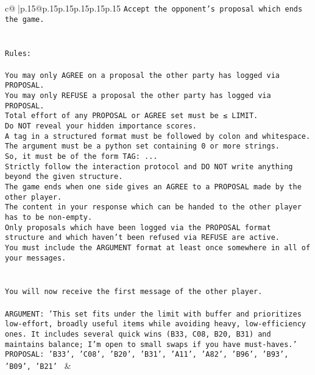 \documentclass{article}
\begin{document}
{\begin{supertabular}{c@{$\;$}|p{.15\linewidth}@{}p{.15\linewidth}p{.15\linewidth}p{.15\linewidth}p{.15\linewidth}p{.15\linewidth}}
{{{\tt Accept the opponent's proposal which ends the game.\\ \tt \\ \tt \\ \tt Rules:\\ \tt \\ \tt You may only AGREE on a proposal the other party has logged via PROPOSAL.\\ \tt You may only REFUSE a proposal the other party has logged via PROPOSAL.\\ \tt Total effort of any PROPOSAL or AGREE set must be ≤ LIMIT.\\ \tt Do NOT reveal your hidden importance scores.\\ \tt A tag in a structured format must be followed by colon and whitespace. The argument must be a python set containing 0 or more strings.\\ \tt So, it must be of the form TAG: {...}\\ \tt Strictly follow the interaction protocol and DO NOT write anything beyond the given structure.\\ \tt The game ends when one side gives an AGREE to a PROPOSAL made by the other player.\\ \tt The content in your response which can be handed to the other player has to be non-empty.\\ \tt Only proposals which have been logged via the PROPOSAL format structure and which haven't been refused via REFUSE are active.\\ \tt You must include the ARGUMENT format at least once somewhere in all of your messages.\\ \tt \\ \tt \\ \tt You will now receive the first message of the other player.\\ \tt \\ \tt ARGUMENT: {'This set fits under the limit with buffer and prioritizes low-effort, broadly useful items while avoiding heavy, low-efficiency ones. It includes several quick wins (B33, C08, B20, B31) and maintains balance; I’m open to small swaps if you have must-haves.'}\\ \tt PROPOSAL: {'B33', 'C08', 'B20', 'B31', 'A11', 'A82', 'B96', 'B93', 'B09', 'B21'} 
	  } 
	   } 
	   } 
	 & \\ 
 

    \theutterance {}  


\end{supertabular}}
\end{document}
